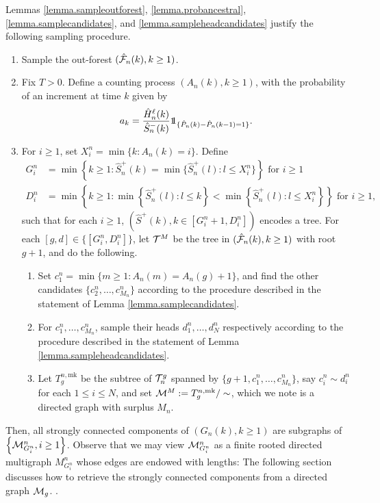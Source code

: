Lemmas \ref{lemma.sampleoutforest}, \ref{lemma.probancestral}, \ref{lemma.samplecandidates}, and \ref{lemma.sampleheadcandidates} justify the following sampling procedure.
\begin{enumerate}
    \item Sample the out-forest $(\hat{{\mathcal F}}_n(k),k\geq 1)$.
    \item Fix $T>0$. Define a counting process $(A_n(k),k\geq 1)$, with the probability of an increment at time $k$ given by $$a_k=\frac{\hat{H}_n^\ell(k)}{\hat{S}_n^-(k)}\one_{\{\hat{P}_n(k)-\hat{P}_n(k-1)=1\}}.$$
    \item For $i\geq 1$, set $X_i^n=\min\{k:A_n(k)=i\}$. Define
\begin{align*}G_i^n&=\min\left\{k\geq 1:\hat{S}^{+}_n(k)=\min\{\hat{S}^{+}_n(l):l\leq X_i^n\}\right\}\text{ for }i\geq 1\\
D_i^n&=\min\left\{k \geq 1: \min\left\{\hat{S}^{+}_n(l):l\leq k\right\} < \min\left\{\hat{S}^{+}_n(l):l\leq X_i^n\right\}\right\}\text{ for }i\geq 1,
\end{align*}
such that for each $i\geq 1$, $\left(\hat{S}^+(k),k\in [G_i^n+1,D_i^n]\right)$ encodes a tree. For each $[g,d]\in \{[G_i^n,D_i^n]\}$, let ${\mathcal T}^M$ be the tree in $(\hat{{\mathcal F}}_n(k),k\geq 1)$ with root $g+1$, and do the following.
    \begin{enumerate}
    \item \label{item.procedure3} Set $c_1^n=\min\{m\geq 1:A_n(m)=A_n(g)+1\}$, and find the other candidates $\{c_2^n,\dots ,c_{M_n}^n\}$ according to the procedure described in the statement of Lemma \ref{lemma.samplecandidates}.
    \item \label{item.procedure4} For $c_1^n,\dots, c_{M_n}^n$, sample their heads $d_1^n,\dots ,d_N^n$ respectively according to the procedure described in the statement of Lemma \ref{lemma.sampleheadcandidates}.
    \item Let $T^{n,\text{mk}}_{g}$ be the subtree of ${\mathcal T}^{g}_n$ spanned by $\{g+1,c_1^n,\dots ,c_{M_n}^n\}$, say $c_i^n\sim d_i^n$ for each $1\leq i\leq N$, and set ${\mathcal M}^M:=T^{n,\text{mk}}_g/\sim$, which we note is a directed graph with surplus $M_n$. 
\end{enumerate}
\end{enumerate}
Then, all strongly connected components of $(G_n(k),k\geq 1)$ are subgraphs of $\left\{{\mathcal M}^n_{G_i^n}, i\geq 1 \right\}$. Observe that we may view ${\mathcal M}^n_{G_i^n}$ as a finite rooted directed multigraph $M^n_{G_i^n}$ whose edges are endowed with lengths:  The following section discusses how to retrieve the strongly connected components from a directed graph ${\mathcal M}_g$.
. 



